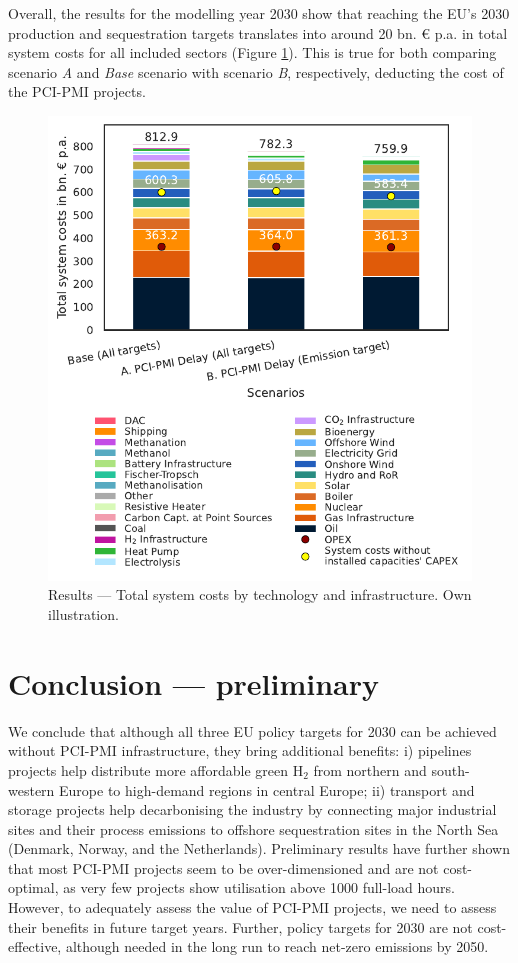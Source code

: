 \documentclass[final,5p,times,twocolumn]{elsarticle}
\begin{document}
Overall, the results for the modelling year 2030 show that reaching the EU's 2030  production and  sequestration targets translates into around 20 bn. \euro{} p.a. in total system costs for all included sectors (Figure \ref{fig:system_costs}). This is true for both comparing scenario \textit{A} and \textit{Base} scenario with scenario \textit{B}, respectively, deducting the cost of the PCI-PMI projects.

\begin{figure}[htbp]
  \centering
  \includegraphics[width=\linewidth]{system_costs}
  \caption{Results --- Total system costs by technology and infrastructure. Own illustration.}
  \label{fig:system_costs}
\end{figure}


\section{Conclusion --- preliminary}
\label{sec:conclusion}
We conclude that although all three EU policy targets for 2030 can be achieved without PCI-PMI infrastructure, they bring additional benefits: i)  pipelines projects help distribute more affordable green H$_2$ from northern and south-western Europe to high-demand regions in central Europe; ii)  transport and storage projects help decarbonising the industry by connecting major industrial sites and their process emissions to offshore sequestration sites in the North Sea (Denmark, Norway, and the Netherlands). Preliminary results have further shown that most PCI-PMI projects seem to be over-dimensioned and are not cost-optimal, as very few projects show utilisation above 1000 full-load hours. However, to adequately assess the value of PCI-PMI projects, we need to assess their benefits in future target years. Further, policy targets for 2030 are not cost-effective, although needed in the long run to reach net-zero emissions by 2050.
\end{document}
